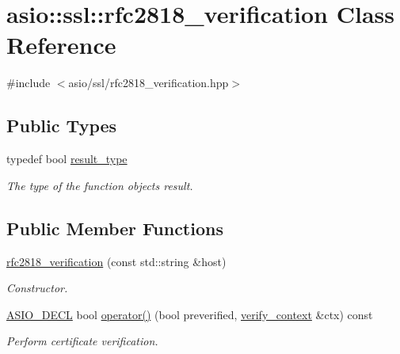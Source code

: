 \hypertarget{classasio_1_1ssl_1_1rfc2818__verification}{}\section{asio\+:\+:ssl\+:\+:rfc2818\+\_\+verification Class Reference}
\label{classasio_1_1ssl_1_1rfc2818__verification}


{\ttfamily \#include $<$asio/ssl/rfc2818\+\_\+verification.\+hpp$>$}

\subsection*{Public Types}
\begin{DoxyCompactItemize}
\item 
typedef bool \hyperlink{classasio_1_1ssl_1_1rfc2818__verification_a793767089e5bc88c7c28ed182e9cba02}{result\+\_\+type}
\begin{DoxyCompactList}\small\item\em The type of the function object\textquotesingle{}s result. \end{DoxyCompactList}\end{DoxyCompactItemize}
\subsection*{Public Member Functions}
\begin{DoxyCompactItemize}
\item 
\hyperlink{classasio_1_1ssl_1_1rfc2818__verification_a169b8df5bed1cdf4099bc424b0e99ddd}{rfc2818\+\_\+verification} (const std\+::string \&host)
\begin{DoxyCompactList}\small\item\em Constructor. \end{DoxyCompactList}\item 
\hyperlink{config_8hpp_ab54d01ea04afeb9a8b39cfac467656b7}{A\+S\+I\+O\+\_\+\+D\+E\+C\+L} bool \hyperlink{classasio_1_1ssl_1_1rfc2818__verification_a0ffc96e1ffe4cc3966b31c9f129534f7}{operator()} (bool preverified, \hyperlink{classasio_1_1ssl_1_1verify__context}{verify\+\_\+context} \&ctx) const 
\begin{DoxyCompactList}\small\item\em Perform certificate verification. \end{DoxyCompactList}\end{DoxyCompactItemize}


